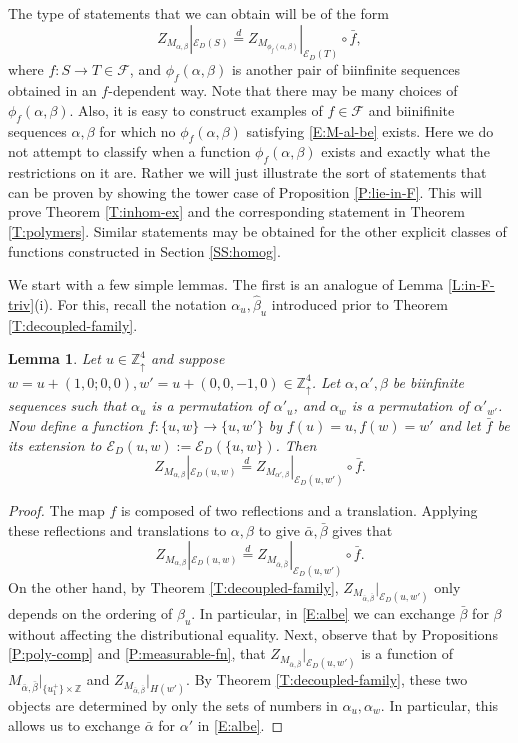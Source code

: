 \documentclass[aop, preprint]{imsart}
\theoremstyle{plain}
\newtheorem{lemma}[theorem]{Lemma}
\theoremstyle{definition}
\theoremstyle{plain}
\newcommand{\al}{\alpha}
\newcommand{\be}{\beta}
\newcommand{\scrE}{\mathcal{E}}
\newcommand{\Zd}{\mathds{Z}^4_\uparrow}
\newcommand{\scrF}{\mathcal{F}}
\newcommand{\Z}{\mathds{Z}}
\newcommand{\eqd}{\stackrel{d}{=}}
\newcommand{\X}{\times}
\newcommand{\duncan}[1]{{\color{red} #1}}
\begin{document}
The type of statements that we can obtain will be of the form
\begin{equation}
\label{E:M-al-be}
Z_{M_{\al, \be}}|_{\scrE_D(S)} \eqd Z_{M_{\phi_f(\al, \be)}}|_{\scrE_D(T)} \circ \bar f,
\end{equation}
where $f:S \to T \in \scrF$, and $\phi_f(\al, \be)$ is another pair of biinfinite sequences obtained in an $f$-dependent way. Note that there may be many choices of $\phi_f(\al, \be)$. Also, it is easy to construct examples of  $f \in \scrF$ and biinifinite sequences $\al, \be$ for which no $\phi_f(\al, \be)$ satisfying \eqref{E:M-al-be} exists. Here we do not attempt to classify when a function $\phi_f(\al, \be)$ exists and exactly what the restrictions on it are. 
Rather we will just illustrate the sort of statements that can be proven by showing the tower case of Proposition \ref{P:lie-in-F}. This will prove Theorem \ref{T:inhom-ex} and the corresponding statement in Theorem \ref{T:polymers}. Similar statements may be obtained for the other explicit classes of functions constructed in Section \ref{SS:homog}.

We start with a few simple lemmas. The first is an analogue of Lemma \ref{L:in-F-triv}(i). For this, recall the notation $\al_u, \hat \be_u$ introduced prior to Theorem \ref{T:decoupled-family}.

\begin{lemma}
	\label{L:no-dependence}
	Let $u \in \Zd$ and suppose $w = u + (1, 0; 0,0), w' = u + (0, 0, -1, 0) \in \Zd$. Let $\al, \al', \be$ be biinfinite sequences such that $\al_u$ is a permutation of $\al'_u$, and $\al_w$ is a permutation of $\al'_{w'}$. Now define a function $f:\{u, w\} \to \{u, w'\}$ by $f(u) = u, f(w) = w'$ and let $\bar f$ be its extension to $\scrE_D(u,w) := \scrE_D(\{u, w\})$. Then
	$$
	Z_{M_{\al, \be}}|_{\scrE_D(u, w)} \eqd Z_{M_{\al', \be}}|_{\scrE_D(u, w')} \circ \bar f.
	$$ 
\end{lemma}

\begin{proof}
	The map $f$ is composed of two reflections and a translation. Applying these reflections and translations to $\al, \be$ to give $\bar \al, \bar \be$ gives that 
	\begin{equation}
	\label{E:albe}
	Z_{M_{\al, \be}}|_{\scrE_D(u, w)} \eqd Z_{M_{\bar \al, \bar \be}}|_{\scrE_D(u, w')} \circ \bar f.
	\end{equation}
	On the other hand, by Theorem \ref{T:decoupled-family}, $Z_{M_{\bar \al, \bar \be}}|_{\scrE_D(u, w')}$ only depends on the ordering of $\be_u$. In particular, in \eqref{E:albe} we can exchange $\bar \be$ for $\be$ without affecting the distributional equality. Next, observe that by Propositions \ref{P:poly-comp} and \ref{P:measurable-fn}, that $Z_{M_{\bar \al, \bar \be}}|_{\scrE_D(u, w')}$ is a function of $M_{\bar \al, \bar \be}|_{\{u^+_1\} \X \Z}$ and $Z_{M_{\bar \al, \bar \be}}|_{H(w')}$. By Theorem \ref{T:decoupled-family}, these two objects are determined by only the sets of numbers in $\al_u, \al_w$. In particular, this allows us to exchange $\bar \al$ for $\al'$ in \eqref{E:albe}.
\end{proof}
\end{document}
